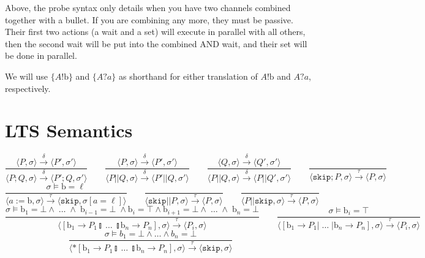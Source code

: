 \documentclass{article}
\begin{document}
Above, the probe syntax only details when you have two channels combined together with a bullet.  If you are combining any more, they must be passive.  Their first two actions (a wait and a set) will execute in parallel with all others, then the second wait will be put into the combined AND wait, and their set will be done in parallel.

We will use $\{A!\mathrm{b}\}$ and $\{A?a\}$ as shorthand for either translation of $A!\mathrm{b}$ and $A?a$, respectively.

\section{LTS Semantics}
$$
    \frac{\langle P, \sigma \rangle \xrightarrow{\delta} \langle P', \sigma' \rangle}{\langle P ; Q, \sigma \rangle \xrightarrow{\delta} \langle P' ; Q, \sigma' \rangle} \qquad
    \frac{\langle P, \sigma \rangle \xrightarrow{\delta} \langle P', \sigma' \rangle}{\langle P || Q, \sigma \rangle \xrightarrow{\delta} \langle P' || Q, \sigma' \rangle} \qquad
    \frac{\langle Q, \sigma \rangle \xrightarrow{\delta} \langle Q', \sigma' \rangle}{\langle P || Q, \sigma \rangle \xrightarrow{\delta} \langle P || Q', \sigma' \rangle} \qquad
    \frac{}{\langle \mathtt{skip}; P, \sigma \rangle \xrightarrow{\tau} \langle P, \sigma \rangle} $$$$
    \frac{\sigma \models \mathrm{b} = \ell}{\langle a := \mathrm{b}, \sigma \rangle \xrightarrow{\tau} \langle \mathtt{skip}, \sigma[a = \ell] \rangle} \qquad
    \frac{}{\langle \mathtt{skip} || P, \sigma \rangle \xrightarrow{\tau} \langle P, \sigma \rangle} \qquad
    \frac{}{\langle P || \mathtt{skip}, \sigma \rangle \xrightarrow{\tau} \langle P, \sigma \rangle} $$$$
    \frac{\sigma \models \mathrm{b}_1 = \bot \wedge \; \ldots \; \wedge \; \mathrm{b}_{i-1} = \bot \; \wedge \mathrm{b}_i = \top \wedge \mathrm{b}_{i+1} = \bot \wedge \; \ldots \; \wedge \; \mathrm{b}_n = \bot} {\langle [ \mathrm{b}_1 \rightarrow P_1  \talloblong \; \ldots \; \talloblong \mathrm{b}_n \rightarrow P_n ] , \sigma \rangle \xrightarrow{\tau} \langle P_i , \sigma\rangle  } \qquad
    \frac{\sigma \models \mathrm{b}_i = \top} {\langle [ \mathrm{b}_1 \rightarrow P_1  | \; \ldots \; | \mathrm{b}_n \rightarrow P_n ] , \sigma \rangle \xrightarrow{\tau} \langle P_i , \sigma\rangle  } $$$$
    \frac{\sigma \models b_1 = \bot \wedge \ldots \wedge b_n = \bot}{\langle *[ \mathrm{b}_1 \rightarrow P_1  \talloblong \; \ldots \; \talloblong \mathrm{b}_n \rightarrow P_n ] , \sigma \rangle \xrightarrow{\tau} \langle \mathtt{skip} , \sigma\rangle } \qquad
$$
\end{document}
